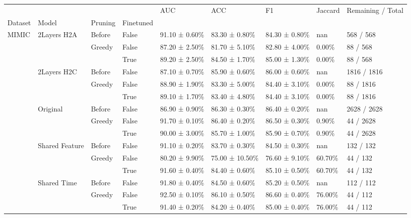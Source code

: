 \begin{tabular}{lllllllll}
\toprule
 &  &  &  & AUC & ACC & F1 & Jaccard & Remaining / Total \\
Dataset & Model & Pruning & Finetuned &  &  &  &  &  \\
\midrule
\multirow[t]{15}{*}{MIMIC} & \multirow[t]{3}{*}{2Layers H2A} & Before & False & 91.10 ± 0.60\% & 83.30 ± 0.80\% & 84.30 ± 0.80\% & nan & 568 / 568 \\
\cline{3-9}
 &  & \multirow[t]{2}{*}{Greedy} & False & 87.20 ± 2.50\% & 81.70 ± 5.10\% & 82.80 ± 4.00\% & 0.00\% & 88 / 568 \\
 &  &  & True & 89.20 ± 2.50\% & 84.50 ± 1.70\% & 85.00 ± 1.30\% & 0.00\% & 88 / 568 \\
\cline{2-9} \cline{3-9}
 & \multirow[t]{3}{*}{2Layers H2C} & Before & False & 87.10 ± 0.70\% & 85.90 ± 0.60\% & 86.00 ± 0.60\% & nan & 1816 / 1816 \\
\cline{3-9}
 &  & \multirow[t]{2}{*}{Greedy} & False & 88.90 ± 1.90\% & 83.30 ± 5.00\% & 84.40 ± 3.10\% & 0.00\% & 88 / 1816 \\
 &  &  & True & 89.10 ± 1.70\% & 83.40 ± 4.80\% & 84.40 ± 3.10\% & 0.00\% & 88 / 1816 \\
\cline{2-9} \cline{3-9}
 & \multirow[t]{3}{*}{Original} & Before & False & 86.90 ± 0.90\% & 86.30 ± 0.30\% & 86.40 ± 0.20\% & nan & 2628 / 2628 \\
\cline{3-9}
 &  & \multirow[t]{2}{*}{Greedy} & False & 91.70 ± 0.10\% & 86.40 ± 0.20\% & 86.50 ± 0.30\% & 0.90\% & 44 / 2628 \\
 &  &  & True & 90.00 ± 3.00\% & 85.70 ± 1.00\% & 85.90 ± 0.70\% & 0.90\% & 44 / 2628 \\
\cline{2-9} \cline{3-9}
 & \multirow[t]{3}{*}{Shared Feature} & Before & False & 91.10 ± 0.20\% & 83.70 ± 0.30\% & 84.50 ± 0.30\% & nan & 132 / 132 \\
\cline{3-9}
 &  & \multirow[t]{2}{*}{Greedy} & False & 80.20 ± 9.90\% & 75.00 ± 10.50\% & 76.60 ± 9.10\% & 60.70\% & 44 / 132 \\
 &  &  & True & 91.60 ± 0.40\% & 84.40 ± 0.60\% & 85.10 ± 0.50\% & 60.70\% & 44 / 132 \\
\cline{2-9} \cline{3-9}
 & \multirow[t]{3}{*}{Shared Time} & Before & False & 91.80 ± 0.40\% & 84.50 ± 0.60\% & 85.20 ± 0.50\% & nan & 112 / 112 \\
\cline{3-9}
 &  & \multirow[t]{2}{*}{Greedy} & False & 92.50 ± 0.10\% & 86.10 ± 0.50\% & 86.60 ± 0.40\% & 76.00\% & 44 / 112 \\
 &  &  & True & 91.40 ± 0.20\% & 84.20 ± 0.40\% & 85.00 ± 0.40\% & 76.00\% & 44 / 112 \\

\end{tabular}
